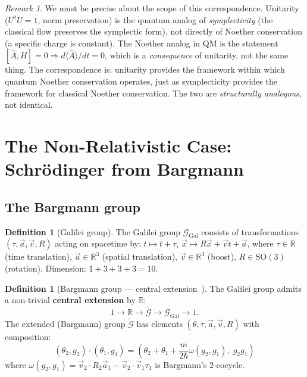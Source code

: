 \documentclass[12pt]{article}
\theoremstyle{plain}
\theoremstyle{definition}
\newtheorem{definition}[theorem]{Definition}
\theoremstyle{remark}
\newtheorem{remark}[theorem]{Remark}
\newcommand{\SO}{\mathrm{SO}}
\begin{document}
\begin{remark}\label{rmk:not-analogy}
We must be precise about the scope of this correspondence. Unitarity ($U^\dagger U = 1$, norm preservation) is the quantum analog of \emph{symplecticity} (the classical flow preserves the symplectic form), not directly of Noether conservation (a specific charge is constant). The Noether analog in QM is the statement $[\hat{A}, H] = 0 \Rightarrow d\langle\hat{A}\rangle/dt = 0$, which is a \emph{consequence} of unitarity, not the same thing. The correspondence is: unitarity provides the framework within which quantum Noether conservation operates, just as symplecticity provides the framework for classical Noether conservation. The two are \emph{structurally analogous}, not identical.
\end{remark}


\section{The Non-Relativistic Case: Schr\"odinger from Bargmann}
\label{sec:schrodinger}

\subsection{The Bargmann group}

\begin{definition}[Galilei group]\label{def:galilei}
The Galilei group $\mathcal{G}_{\mathrm{Gal}}$ consists of transformations $(\tau, \vec{a}, \vec{v}, R)$ acting on spacetime by:
$t \mapsto t + \tau$, $\vec{x} \mapsto R\vec{x} + \vec{v}t + \vec{a}$,
where $\tau \in \mathbb{R}$ (time translation), $\vec{a} \in \mathbb{R}^3$ (spatial translation), $\vec{v} \in \mathbb{R}^3$ (boost), $R \in \SO(3)$ (rotation). Dimension: $1 + 3 + 3 + 3 = 10$.
\end{definition}

\begin{definition}[Bargmann group --- central extension~\cite{bargmann1954}]\label{def:bargmann}
The Galilei group admits a non-trivial \textbf{central extension} by $\mathbb{R}$:
\begin{equation}
1 \to \mathbb{R} \to \widetilde{\mathcal{G}} \to \mathcal{G}_{\mathrm{Gal}} \to 1.
\end{equation}
The extended (Bargmann) group $\widetilde{\mathcal{G}}$ has elements $(\theta, \tau, \vec{a}, \vec{v}, R)$ with composition:
\begin{equation}
(\theta_2, g_2) \cdot (\theta_1, g_1) = \left(\theta_2 + \theta_1 + \frac{m}{2\hbar}\omega(g_2, g_1),\; g_2 g_1\right)
\end{equation}
where $\omega(g_2, g_1) = \vec{v}_2 \cdot R_2\vec{a}_1 - \vec{v}_2 \cdot \vec{v}_1\tau_1$ is Bargmann's 2-cocycle.
\end{definition}
\end{document}
